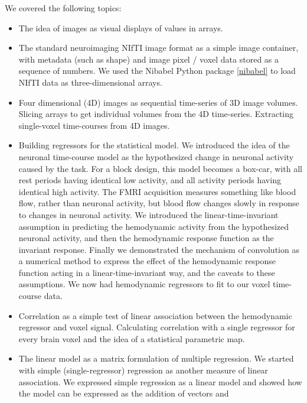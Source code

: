We covered the following topics:

\begin{itemize}

\item
    The idea of images as visual displays of values in arrays.
\item
    The standard neuroimaging NIfTI image format as a simple image container,
        with metadata (such as shape) and image pixel / voxel data stored as
        a sequence of numbers.  We used the Nibabel Python package
        \cref{nibabel} to load NIfTI data as three-dimensional arrays.
\item
    Four dimensional (4D) images as sequential time-series of 3D image
        volumes.  Slicing arrays to get individual volumes from the 4D
        time-series.  Extracting single-voxel time-courses from 4D images.
\item
    Building regressors for the statistical model.  We introduced the idea of
        the neuronal time-course model as the hypothesized change in neuronal
        activity caused by the task.  For a block design, this model becomes a
        box-car, with all rest periods having identical low activity, and all
        activity periods having identical high activity.  The FMRI acquisition
        measures something like blood flow, rather than neuronal activity, but
        blood flow changes slowly in response to changes in neuronal activity.
        We introduced the linear-time-invariant assumption in predicting the
        hemodynamic activity from the hypothesized neuronal activity, and then
        the hemodynamic response function as the invariant response.  Finally
        we demonstrated the mechanism of convolution as a numerical method to
        express the effect of the hemodynamic response function acting in a
        linear-time-invariant way, and the caveats to these assumptions.  We
        now had hemodynamic regressors to fit to our voxel time-course data.
\item
    Correlation as a simple test of linear association between the hemodynamic
        regressor and voxel signal.  Calculating correlation with a single
        regressor for every brain voxel and the idea of a statistical
        parametric map.
\item
    The linear model as a matrix formulation of multiple regression.  We started with
        simple (single-regressor) regression as another measure of linear
        association.  We expressed simple regression as a linear model and
        showed how the model can be expressed as the addition of vectors and

\end{itemize}
